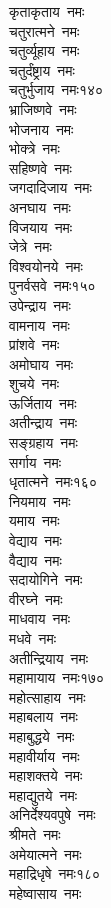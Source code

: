 \begin{multicols}{\maxColumns}
\begin{flushleft}
कृताकृताय~नमः\\
चतुरात्मने~नमः\\
चतुर्व्यूहाय~नमः\\
चतुर्दंष्ट्राय~नमः\\
चतुर्भुजाय~नमः\hfill १४०\\
भ्राजिष्णवे~नमः\\
भोजनाय~नमः\\
भोक्त्रे~नमः\\
सहिष्णवे~नमः\\
जगदादिजाय~नमः\\
अनघाय~नमः\\
विजयाय~नमः\\
जेत्रे~नमः\\
विश्वयोनये~नमः\\
पुनर्वसवे~नमः\hfill १५०\\
उपेन्द्राय~नमः\\
वामनाय~नमः\\
प्रांशवे~नमः\\
अमोघाय~नमः\\
शुचये~नमः\\
ऊर्जिताय~नमः\\
अतीन्द्राय~नमः\\
सङ्ग्रहाय~नमः\\
सर्गाय~नमः\\
धृतात्मने~नमः\hfill १६०\\
नियमाय~नमः\\
यमाय~नमः\\
वेद्याय~नमः\\
वैद्याय~नमः\\
सदायोगिने~नमः\\
वीरघ्ने~नमः\\
माधवाय~नमः\\
मधवे~नमः\\
अतीन्द्रियाय~नमः\\
महामायाय~नमः\hfill १७०\\
महोत्साहाय~नमः\\
महाबलाय~नमः\\
महाबुद्धये~नमः\\
महावीर्याय~नमः\\
महाशक्तये~नमः\\
महाद्युतये~नमः\\
अनिर्देश्यवपुषे~नमः\\
श्रीमते~नमः\\
अमेयात्मने~नमः\\
महाद्रिधृषे~नमः\hfill १८०\\
महेष्वासाय~नमः\\

\end{flushleft}
\end{multicols}
